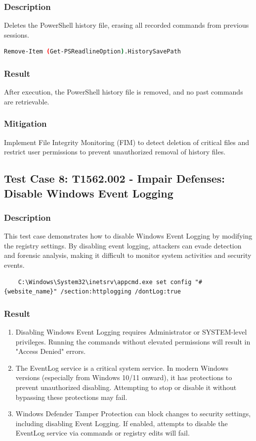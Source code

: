 \documentclass[11pt]{article}
\begin{document}
\subsubsection{Description}
Deletes the PowerShell history file, erasing all recorded commands from previous sessions.
\begin{lstlisting}[language=bash]
    Remove-Item (Get-PSReadlineOption).HistorySavePath
\end{lstlisting}
\subsubsection{Result}
After execution, the PowerShell history file is removed, and no past commands are retrievable.
\subsubsection{Mitigation}
Implement File Integrity Monitoring (FIM) to detect deletion of critical files and restrict user permissions to prevent unauthorized removal of history files.
\subsection{Test Case 8: T1562.002 - Impair Defenses: Disable Windows Event Logging}
\subsubsection{Description}
This test case demonstrates how to disable Windows Event Logging by modifying the registry settings. By disabling event logging, attackers can evade detection and forensic analysis, making it difficult to monitor system activities and security events.
\begin{lstlisting}
    C:\Windows\System32\inetsrv\appcmd.exe set config "#{website_name}" /section:httplogging /dontLog:true
\end{lstlisting}
\subsubsection{Result}
\begin{enumerate}
    \item Disabling Windows Event Logging requires Administrator or SYSTEM-level privileges. Running the commands without elevated permissions will result in "Access Denied" errors.
    \item The EventLog service is a critical system service. In modern Windows versions (especially from Windows 10/11 onward), it has protections to prevent unauthorized disabling. Attempting to stop or disable it without bypassing these protections may fail.
    \item Windows Defender Tamper Protection can block changes to security settings, including disabling Event Logging. If enabled, attempts to disable the EventLog service via commands or registry edits will fail.
\end{enumerate}
\end{document}
